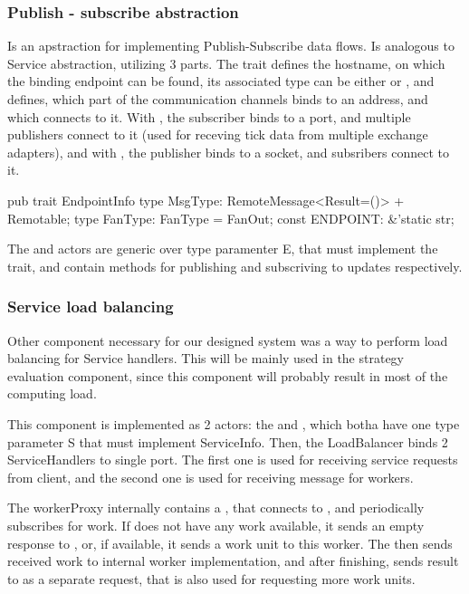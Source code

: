 \subsubsection{Publish - subscribe abstraction}
Is an apstraction for implementing Publish-Subscribe data flows.
Is analogous to Service abstraction, utilizing 3 parts. The  trait defines the hostname, on which
the binding endpoint can be found, its associated type  can be either  or ,
and defines, which part of the communication channels binds to an address, and which connects to it.
With , the subscriber binds to a port, and multiple publishers connect to it (used for receving tick
data from multiple exchange adapters), and with , the publisher binds to a socket, and subsribers connect
to it.

\begin{code}[language=rust,label={endpointinfo_trait},caption={EndpointInfo trait definition}]
pub trait EndpointInfo {
    type MsgType: RemoteMessage<Result=()> + Remotable;
    type FanType: FanType = FanOut;
    const ENDPOINT: &'static str;
}
\end{code}

The  and  actors are generic over type paramenter E, that must implement the 
trait, and contain methods for publishing and subscriving to updates respectively.

\subsubsection{Service load balancing}
Other component necessary for our designed system was a way to perform load balancing for Service handlers.
This will be mainly used in the strategy evaluation component, since this component will probably result in most
of the computing load.

This component is implemented as 2 actors: the  and , which botha have one type
parameter S that must implement ServiceInfo. Then, the LoadBalancer binds 2 ServiceHandlers to single port.
The first one is used for receiving service requests from client, and the second one is used for receiving message for workers.

The workerProxy internally contains a , that connects to , and periodically subscribes
for work. If  does not have any work available, it sends an empty response to ,
or, if available, it sends a work unit to this worker. The  then sends received work to internal
worker implementation, and after finishing, sends result to  as a separate request, that is also used
for requesting more work units.

